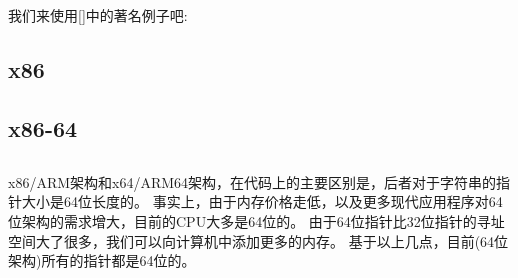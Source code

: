 \section{\HelloWorldSectionName}
\label{sec:helloworld}

我们来使用[\KRBook]中的著名例子吧:



\subsection{x86}




\subsection{x86-64}







\subsection{\Conclusion{}}

x86/ARM架构和x64/ARM64架构，在代码上的主要区别是，后者对于字符串的指针大小是64位长度的。
事实上，由于内存价格走低，以及更多现代应用程序对64位架构的需求增大，目前的\ac{CPU}大多是64位的。
由于64位指针比32位指针的寻址空间大了很多，我们可以向计算机中添加更多的内存。
基于以上几点，目前(64位架构)所有的指针都是64位的。



